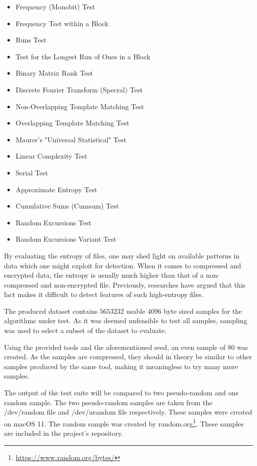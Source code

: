\documentclass[conference]{IEEEtran}
\begin{document}
\begin{itemize}
    \item Frequency (Monobit) Test
    \item Frequency Test within a Block
    \item Runs Test
    \item Test for the Longest Run of Ones in a Block
    \item Binary Matrix Rank Test
    \item Discrete Fourier Transform (Specral) Test
    \item Non-Overlapping Template Matching Test
    \item Overlapping Template Matching Test
    \item Maurer's "Universal Statistical" Test
    \item Linear Complexity Test
    \item Serial Test
    \item Approximate Entropy Test
    \item Cumulative Sums (Cumsum) Test
    \item Random Excursions Test
    \item Random Excursions Variant Test
\end{itemize}

By evaluating the entropy of files, one may shed light on available patterns in data which one might exploit for detection. When it comes to compressed and encrypted data, the entropy is usually much higher than that of a non-compressed and non-encrypted file. Previously, researches have argued that this fact makes it difficult to detect features of such high-entropy files\cite{PENROSE2013}.

The produced dataset contains $5653232$ usable 4096 byte sized samples for the algorithms under test. As it was deemed unfeasible to test all samples, sampling was used to select a subset of the dataset to evaluate.

Using the provided tools and the aforementioned seed, an even sample of 80 was created. As the samples are compressed, they should in theory be similar to other samples produced by the same tool, making it meaningless to try many more samples\cite{HORNEY2013}.

The output of the test suite will be compared to two pseudo-random and one random sample. The two pseudo-random samples are taken from the /dev/random file and /dev/urandom file respectively. These samples were created on macOS 11. The random sample was created by random.org\footnote{\href{https://www.random.org/bytes/}{https://www.random.org/bytes/}}. These samples are included in the project's repository.
\end{document}

